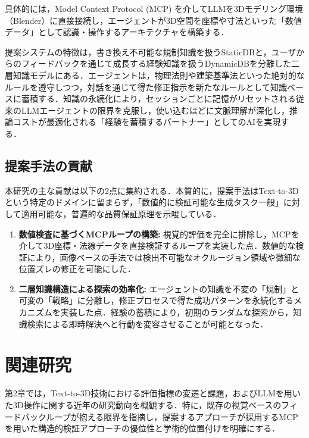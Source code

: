 \documentclass[dvipdfmx, a4paper, 9pt]{deimj}
\begin{document}
具体的には，Model Context Protocol (MCP)\cite{anthropic2024mcp} を介してLLMを3Dモデリング環境（Blender）に直接接続し，エージェントが3D空間を座標や寸法といった「数値データ」として認識・操作するアーキテクチャを構築する．

提案システムの特徴は，書き換え不可能な規制知識を扱うStaticDBと，ユーザからのフィードバックを通じて成長する経験知識を扱うDynamicDBを分離した二層知識モデルにある．エージェントは，物理法則や建築基準法といった絶対的なルールを遵守しつつ，対話を通じて得た修正指示を新たなルールとして知識ベースに蓄積する．知識の永続化により，セッションごとに記憶がリセットされる従来のLLMエージェントの限界を克服し，使い込むほどに文脈理解が深化し，推論コストが最適化される「経験を蓄積するパートナー」としてのAIを実現する．

\subsection{提案手法の貢献}

本研究の主な貢献は以下の2点に集約される．本質的に，提案手法はText-to-3Dという特定のドメインに留まらず，「数値的に検証可能な生成タスク一般」に対して適用可能な，普遍的な品質保証原理を示唆している．
\begin{enumerate}
    \item \textbf{数値検査に基づくMCPループの構築:} 
    視覚的評価を完全に排除し，MCPを介して3D座標・法線データを直接検証するループを実装した点．数値的な検証により，画像ベースの手法では検出不可能なオクルージョン領域や微細な位置ズレの修正を可能にした．
    \item \textbf{二層知識構造による探索の効率化:} 
    エージェントの知識を不変の「規制」と可変の「戦略」に分離し，修正プロセスで得た成功パターンを永続化するメカニズムを実装した点．経験の蓄積により，初期のランダムな探索から，知識検索による即時解決へと行動を変容させることが可能となった．
\end{enumerate}

\section{関連研究}

第2章では，Text-to-3D技術における評価指標の変遷と課題，およびLLMを用いた3D操作に関する近年の研究動向を概観する．特に，既存の視覚ベースのフィードバックループが抱える限界を指摘し，提案するアプローチが採用するMCPを用いた構造的検証アプローチの優位性と学術的位置付けを明確にする．
\end{document}

